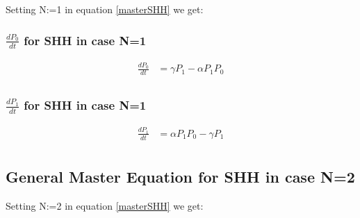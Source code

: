 \documentclass[paper=a4, fontsize=11pt, twoside, BCOR=12mm, parskip=full, listof=totoc]{scrreprt}
\begin{document}
	Setting N:=1 in equation \eqref{masterSHH} we get:

\subsubsection*{$\frac{dP_0}{dt}$ for SHH in case N=1}
	\begin{equation}
		\begin{aligned}
			{\frac{dP_0}{dt}} & = \gamma P_{1} - \alpha P_{1} P_{0} \\					
		\end{aligned}
	\end{equation}

\subsubsection*{$\frac{dP_1}{dt}$ for SHH in case N=1}

	\begin{equation}
		\begin{aligned}
			{\frac{dP_1}{dt}} & = \alpha P_{1} P_{0} - \gamma P_{1} \\
		\end{aligned}
	\end{equation}

\subsection*{General Master Equation for SHH in case N=2}

	Setting N:=2 in equation \eqref{masterSHH} we get:
\end{document}
